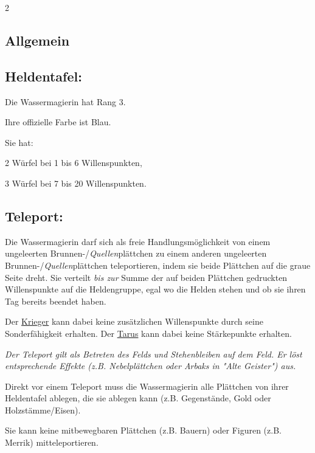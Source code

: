 \documentclass[10pt, a4paper, oneside]{book}
\newcommand{\fan}[1]{\textit{#1}}
\begin{document}
\begin{multicols*}{2}\raggedcolumns

\begin{nobgcolor}

\section{Allgemein}


\subsection{Heldentafel:}

Die Wassermagierin hat Rang 3.

Ihre offizielle Farbe ist Blau.

Sie hat:

\bullet{} 2 Würfel bei 1 bis 6 Willenspunkten,

\bullet{} 3 Würfel bei 7 bis 20 Willenspunkten.





\subsection{Teleport:}

Die Wassermagierin darf sich als freie Handlungsmöglichkeit von einem ungeleerten Brunnen-/\fan{Quellen}plättchen zu einem anderen ungeleerten Brunnen-/\fan{Quellen}plättchen teleportieren, indem sie beide Plättchen auf die graue Seite dreht. Sie verteilt \fan{bis zur} Summe der auf beiden Plättchen gedruckten Willenspunkte auf die Heldengruppe, egal wo die Helden stehen und ob sie ihren Tag bereits beendet haben.

Der \hyperref[krieger]{Krieger} kann dabei keine zusätzlichen Willenspunkte durch seine Sonderfähigkeit erhalten. Der \hyperref[tarus]{Tarus} kann dabei keine Stärkepunkte erhalten.


\fan{Der Teleport gilt als Betreten des Felds und Stehenbleiben auf dem Feld. Er löst entsprechende Effekte (z.B. Nebelplättchen oder Arbaks in "Alte Geister") aus.}


Direkt vor einem Teleport muss die Wassermagierin alle Plättchen von ihrer Heldentafel ablegen, die sie ablegen kann (z.B. Gegenstände, Gold oder Holzstämme/Eisen).

Sie kann keine mitbewegbaren Plättchen (z.B. Bauern) oder Figuren (z.B. Merrik) mitteleportieren.






\end{nobgcolor}
\end{multicols*}
\end{document}
